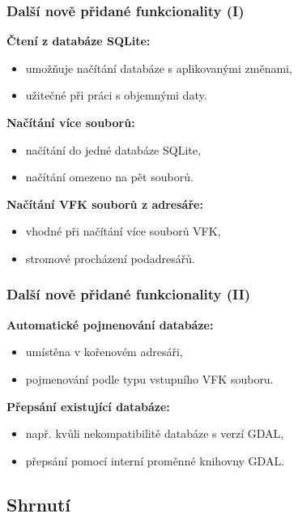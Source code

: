 \documentclass{beamer}
\begin{document}
\begin{frame}
\frametitle{Další nově přidané funkcionality (I)}

\textbf{Čtení z databáze SQLite:}
\begin{itemize}
 \item umožňuje načítání databáze s aplikovanými změnami,
 \item užitečné při práci s objemnými daty.
\end{itemize}

\textbf{Načítání více souborů:}
\begin{itemize}
 \item načítání do jedné databáze SQLite,
 \item načítání omezeno na pět souborů.
\end{itemize}

\textbf{Načítání VFK souborů z adresáře:}
\begin{itemize}
 \item vhodné při načítání více souborů VFK,
 \item stromové procházení podadresářů.
\end{itemize}

\end{frame}


\begin{frame}
\frametitle{Další nově přidané funkcionality (II)}


\textbf{Automatické pojmenování databáze:}
\begin{itemize}
 \item umístěna v kořenovém adresáři,
 \item pojmenování podle typu vstupního VFK souboru.
\end{itemize}

\textbf{Přepsání existující databáze:}
\begin{itemize}
 \item např. kvůli nekompatibilitě databáze s verzí GDAL,
 \item přepsání pomocí interní proměnné knihovny GDAL.
\end{itemize}

\end{frame}


\subsection{Shrnutí}
\end{document}
